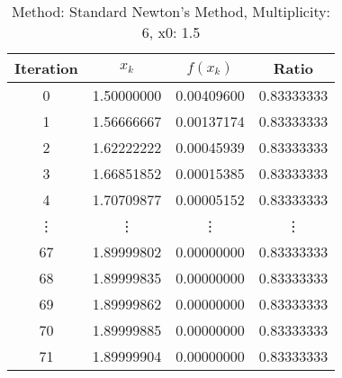 \begin{table}
\centering
\caption{Method: Standard Newton's Method, Multiplicity: 6, x0: 1.5}
\label{tab:table_Standard_Newton's_Method_6_1_5}
\begin{tabular}{c c c c}
\toprule
Iteration &      $x_k$ &   $f(x_k)$ &      Ratio \\
\midrule
        0 & 1.50000000 & 0.00409600 & 0.83333333 \\
        1 & 1.56666667 & 0.00137174 & 0.83333333 \\
        2 & 1.62222222 & 0.00045939 & 0.83333333 \\
        3 & 1.66851852 & 0.00015385 & 0.83333333 \\
        4 & 1.70709877 & 0.00005152 & 0.83333333 \\
   \vdots &     \vdots &     \vdots &     \vdots \\
       67 & 1.89999802 & 0.00000000 & 0.83333333 \\
       68 & 1.89999835 & 0.00000000 & 0.83333333 \\
       69 & 1.89999862 & 0.00000000 & 0.83333333 \\
       70 & 1.89999885 & 0.00000000 & 0.83333333 \\
       71 & 1.89999904 & 0.00000000 & 0.83333333 \\
\bottomrule
\end{tabular}
\end{table}
